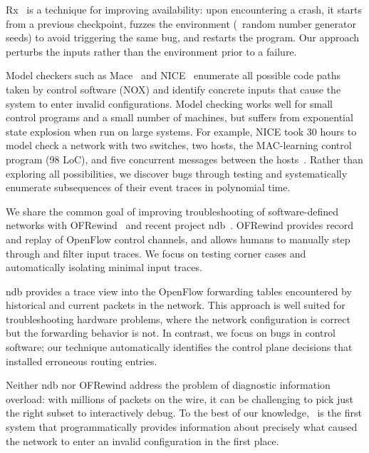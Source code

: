 {{Rx~\cite{qin2005rx} is a technique for improving availability: upon
encountering a crash, it starts from a previous checkpoint, fuzzes
the environment (\eg~random number generator seeds) to avoid triggering the same bug,
and restarts the program. Our
approach perturbs the inputs rather than the environment
prior to a failure.

Model checkers such as Mace~\cite{Killian:2007:MLS:1250734.1250755} and
NICE~\cite{nice} enumerate all possible code paths taken by control software (NOX)
and identify concrete inputs that cause
the system to enter invalid configurations. Model checking works well for small
control programs and a small number of machines, but suffers from exponential
state explosion when run on large systems. For example, NICE took 30 hours to
model check a network with two switches, two hosts, the MAC-learning
control program (98 LoC), and five concurrent
messages between the hosts~\cite{nice}. Rather than exploring all
possibilities, we discover bugs through testing and systematically
enumerate subsequences of their event traces
in polynomial time.

We share the common goal of improving troubleshooting
of software-defined networks with OFRewind~\cite{ofrewind} and
recent project ndb~\cite{handigol2012debugger}. OFRewind provides
record and replay of OpenFlow control channels, and
allows humans to manually step through and filter input traces.
We focus on testing corner cases and automatically
isolating minimal input traces.

ndb provides a
trace view into the OpenFlow forwarding tables
encountered by historical and current packets in the network.
This approach is well suited for troubleshooting hardware problems, where the
network configuration is correct but the forwarding behavior is not.
In contrast, we focus on bugs in control software; our technique
automatically identifies the control plane decisions that installed
erroneous routing entries.

Neither ndb nor OFRewind address the problem of diagnostic information
overload: with millions of packets on the wire, it can
be challenging to pick just the right subset to interactively debug.
To the
best of our knowledge, \projectname~is the first system that programmatically provides
information about precisely what caused the network to enter an invalid
configuration in the first place.


}}
